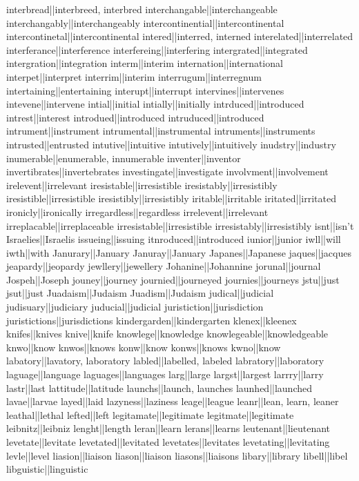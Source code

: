 interbread||interbreed, interbred
interchangable||interchangeable
interchangably||interchangeably
intercontinential||intercontinental
intercontinetal||intercontinental
intered||interred, interned
interelated||interrelated
interferance||interference
interfereing||interfering
intergrated||integrated
intergration||integration
interm||interim
internation||international
interpet||interpret
interrim||interim
interrugum||interregnum
intertaining||entertaining
interupt||interrupt
intervines||intervenes
intevene||intervene
intial||initial
intially||initially
intrduced||introduced
intrest||interest
introdued||introduced
intruduced||introduced
intrument||instrument
intrumental||instrumental
intruments||instruments
intrusted||entrusted
intutive||intuitive
intutively||intuitively
inudstry||industry
inumerable||enumerable, innumerable
inventer||inventor
invertibrates||invertebrates
investingate||investigate
involvment||involvement
irelevent||irrelevant
iresistable||irresistible
iresistably||irresistibly
iresistible||irresistible
iresistibly||irresistibly
iritable||irritable
iritated||irritated
ironicly||ironically
irregardless||regardless
irrelevent||irrelevant
irreplacable||irreplaceable
irresistable||irresistible
irresistably||irresistibly
isnt||isn't
Israelies||Israelis
issueing||issuing
itnroduced||introduced
iunior||junior
iwll||will
iwth||with
Janurary||January
Januray||January
Japanes||Japanese
jaques||jacques
jeapardy||jeopardy
jewllery||jewellery
Johanine||Johannine
jorunal||journal
Jospeh||Joseph
jouney||journey
journied||journeyed
journies||journeys
jstu||just
jsut||just
Juadaism||Judaism
Juadism||Judaism
judical||judicial
judisuary||judiciary
juducial||judicial
juristiction||jurisdiction
juristictions||jurisdictions
kindergarden||kindergarten
klenex||kleenex
knifes||knives
knive||knife
knowlege||knowledge
knowlegeable||knowledgeable
knwo||know
knwos||knows
konw||know
konws||knows
kwno||know
labatory||lavatory, laboratory
labled||labelled, labeled
labratory||laboratory
laguage||language
laguages||languages
larg||large
largst||largest
larrry||larry
lastr||last
lattitude||latitude
launchs||launch, launches
launhed||launched
lavae||larvae
layed||laid
lazyness||laziness
leage||league
leanr||lean, learn, leaner
leathal||lethal
lefted||left
legitamate||legitimate
legitmate||legitimate
leibnitz||leibniz
lenght||length
leran||learn
lerans||learns
leutenant||lieutenant
levetate||levitate
levetated||levitated
levetates||levitates
levetating||levitating
levle||level
liasion||liaison
liason||liaison
liasons||liaisons
libary||library
libell||libel
libguistic||linguistic

